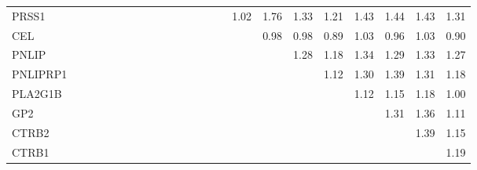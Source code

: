 \begin{longtable}{lrrrrrrrrrrrrrrrrrrrrrr}
PRSS1    &              &              &              &              &             &             &             &             &            &              &            &            &            &             &      1.02 &        1.76 &           1.33 &          1.21 &      1.43 &        1.44 &        1.43 &       1.31 \\
CEL      &              &              &              &              &             &             &             &             &            &              &            &            &            &             &           &        0.98 &           0.98 &          0.89 &      1.03 &        0.96 &        1.03 &       0.90 \\
PNLIP    &              &              &              &              &             &             &             &             &            &              &            &            &            &             &           &             &           1.28 &          1.18 &      1.34 &        1.29 &        1.33 &       1.27 \\
PNLIPRP1 &              &              &              &              &             &             &             &             &            &              &            &            &            &             &           &             &                &          1.12 &      1.30 &        1.39 &        1.31 &       1.18 \\
PLA2G1B  &              &              &              &              &             &             &             &             &            &              &            &            &            &             &           &             &                &               &      1.12 &        1.15 &        1.18 &       1.00 \\
GP2      &              &              &              &              &             &             &             &             &            &              &            &            &            &             &           &             &                &               &           &        1.31 &        1.36 &       1.11 \\
CTRB2    &              &              &              &              &             &             &             &             &            &              &            &            &            &             &           &             &                &               &           &             &        1.39 &       1.15 \\
CTRB1    &              &              &              &              &             &             &             &             &            &              &            &            &            &             &           &             &                &               &           &             &             &       1.19 \\
\end{longtable}


